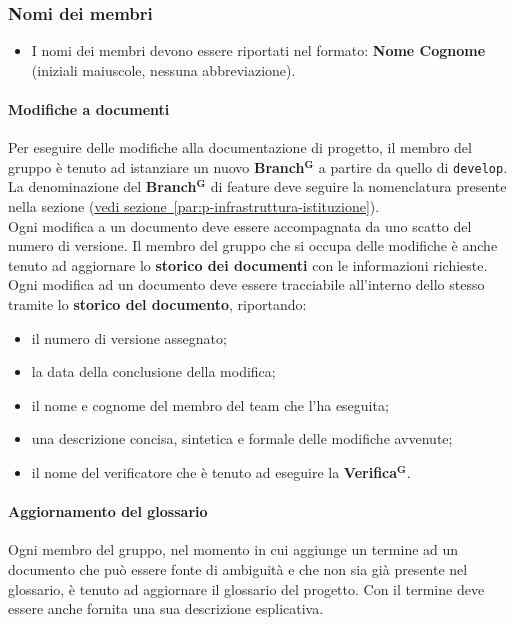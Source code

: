 \documentclass[a4paper,12pt]{article}
\newcommand{\term}[1]{\textbf{#1}$^\mathbf{G}$}
\begin{document}
\subsubsection*{Nomi dei membri}
\begin{itemize}
    \item I nomi dei membri devono essere riportati nel formato: \textbf{Nome Cognome} (iniziali maiuscole, nessuna abbreviazione).
\end{itemize}

\paragraph{Modifiche a documenti}
Per eseguire delle modifiche alla documentazione di progetto, il membro del gruppo è tenuto ad istanziare un nuovo \term{Branch} a partire da quello di \texttt{develop}. La denominazione del \term{Branch} di feature deve seguire la nomenclatura presente nella sezione (\hyperref[par:p-infrastruttura-istituzione]{vedi sezione~\ref*{par:p-infrastruttura-istituzione}}).
\\Ogni modifica a un documento deve essere accompagnata da uno scatto del numero di versione. Il membro del gruppo che si occupa delle modifiche è anche tenuto ad aggiornare lo \textbf{storico dei documenti} con le informazioni richieste.\\ 
Ogni modifica ad un documento deve essere tracciabile all’interno dello stesso tramite lo \textbf{storico del documento}, riportando:
  \begin{itemize}
      \item il numero di versione assegnato;
      \item la data della conclusione della modifica;
      \item il nome e cognome del membro del team che l'ha eseguita;
      \item una descrizione concisa, sintetica e formale delle modifiche avvenute;
      \item il nome del verificatore che è tenuto ad eseguire la \term{Verifica}.
  \end{itemize}

\paragraph{Aggiornamento del glossario}
Ogni membro del gruppo, nel momento in cui aggiunge un termine ad un documento che può essere fonte di ambiguità e che non sia già presente nel glossario, è tenuto ad aggiornare il glossario del progetto. Con il termine deve essere anche fornita una sua descrizione esplicativa.
\end{document}
